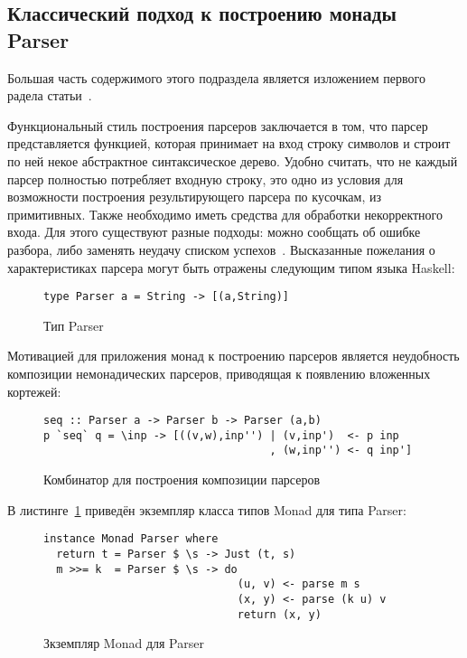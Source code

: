 \subsection{Классический подход к построению монады Parser}

Большая часть содержимого этого подраздела является изложением первого радела статьи~\autocite{MonParsing}.

Функциональный стиль построения парсеров заключается в том, что парсер представляется функцией, которая принимает на вход строку символов и строит по ней некое абстрактное синтаксическое дерево. Удобно считать, что не каждый парсер полностью потребляет входную строку, это одно из условия для возможности построения результирующего парсера по кусочкам, из примитивных. Также необходимо иметь средства для обработки некорректного входа. Для этого существуют разные подходы: можно сообщать об ошибке разбора, либо заменять неудачу списком успехов~\autocite{WadlerSuccess}. Высказанные пожелания о характеристиках парсера могут быть отражены следующим типом языка Haskell:

\begin{figure}[h]
\begin{lstlisting}
type Parser a = String -> [(a,String)]
\end{lstlisting}
\caption{Тип Parser}
\end{figure}

Мотивацией для приложения монад к построению парсеров является неудобность композиции немонадических парсеров, приводящая к появлению вложенных кортежей:

\begin{figure}[h]
\begin{lstlisting}
seq :: Parser a -> Parser b -> Parser (a,b)
p `seq` q = \inp -> [((v,w),inp'') | (v,inp')  <- p inp
                                   , (w,inp'') <- q inp']
\end{lstlisting}
\caption{Комбинатор для построения композиции парсеров}
\end{figure}

В листинге~\ref{listing:MonadParser} приведён экземпляр класса типов Monad для типа Parser:

\begin{figure}[t]
  \begin{lstlisting}
instance Monad Parser where
  return t = Parser $ \s -> Just (t, s)
  m >>= k  = Parser $ \s -> do
                              (u, v) <- parse m s
                              (x, y) <- parse (k u) v
                              return (x, y)
  \end{lstlisting}
  \caption{Зкземпляр Monad для Parser}
  \label{listing:MonadParser}
\end{figure}

